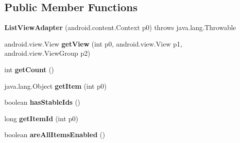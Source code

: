 \subsection*{Public Member Functions}
\begin{DoxyCompactItemize}
\item 
\hypertarget{classmd5282f1122c1313907b9bf274dd2c2f344_1_1ListViewAdapter_a89c134c08e35d4a103b2dd6ab35f27a4}{}{\bfseries List\+View\+Adapter} (android.\+content.\+Context p0)  throws java.\+lang.\+Throwable 	\label{classmd5282f1122c1313907b9bf274dd2c2f344_1_1ListViewAdapter_a89c134c08e35d4a103b2dd6ab35f27a4}

\item 
\hypertarget{classmd5282f1122c1313907b9bf274dd2c2f344_1_1ListViewAdapter_a89591c526049f7db6e1208f74eb64090}{}android.\+view.\+View {\bfseries get\+View} (int p0, android.\+view.\+View p1, android.\+view.\+View\+Group p2)\label{classmd5282f1122c1313907b9bf274dd2c2f344_1_1ListViewAdapter_a89591c526049f7db6e1208f74eb64090}

\item 
\hypertarget{classmd5282f1122c1313907b9bf274dd2c2f344_1_1ListViewAdapter_a2a2abc589f412adad81cbb754f1a66cf}{}int {\bfseries get\+Count} ()\label{classmd5282f1122c1313907b9bf274dd2c2f344_1_1ListViewAdapter_a2a2abc589f412adad81cbb754f1a66cf}

\item 
\hypertarget{classmd5282f1122c1313907b9bf274dd2c2f344_1_1ListViewAdapter_a492049bd14eed2bbb186ba7fd826e748}{}java.\+lang.\+Object {\bfseries get\+Item} (int p0)\label{classmd5282f1122c1313907b9bf274dd2c2f344_1_1ListViewAdapter_a492049bd14eed2bbb186ba7fd826e748}

\item 
\hypertarget{classmd5282f1122c1313907b9bf274dd2c2f344_1_1ListViewAdapter_af8047f78c47c36c99a857e0465d70e91}{}boolean {\bfseries has\+Stable\+Ids} ()\label{classmd5282f1122c1313907b9bf274dd2c2f344_1_1ListViewAdapter_af8047f78c47c36c99a857e0465d70e91}

\item 
\hypertarget{classmd5282f1122c1313907b9bf274dd2c2f344_1_1ListViewAdapter_a01d8c92fe15f808317342b7662da14ab}{}long {\bfseries get\+Item\+Id} (int p0)\label{classmd5282f1122c1313907b9bf274dd2c2f344_1_1ListViewAdapter_a01d8c92fe15f808317342b7662da14ab}

\item 
\hypertarget{classmd5282f1122c1313907b9bf274dd2c2f344_1_1ListViewAdapter_a914559c0826d9fbfeecc78228a5abbda}{}boolean {\bfseries are\+All\+Items\+Enabled} ()\label{classmd5282f1122c1313907b9bf274dd2c2f344_1_1ListViewAdapter_a914559c0826d9fbfeecc78228a5abbda}


\end{DoxyCompactItemize}
